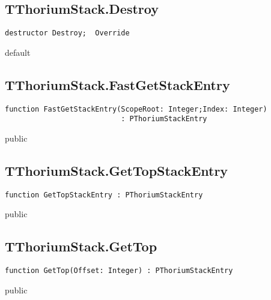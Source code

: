 \subsection{TThoriumStack.Destroy}
\label{thoriumcore:thorium:tthoriumstack:destroy}
\begin{FPCList}
\Synopsis
\Declaration 

\begin{verbatim}
destructor Destroy;  Override
\end{verbatim}
\Visibility
default
\Description
\Errors
\end{FPCList}
\subsection{TThoriumStack.FastGetStackEntry}
\label{thoriumcore:thorium:tthoriumstack:fastgetstackentry}
\begin{FPCList}
\Synopsis
\Declaration 

\begin{verbatim}
function FastGetStackEntry(ScopeRoot: Integer;Index: Integer)
                           : PThoriumStackEntry
\end{verbatim}
\Visibility
public
\Description
\Errors
\end{FPCList}
\subsection{TThoriumStack.GetTopStackEntry}
\label{thoriumcore:thorium:tthoriumstack:gettopstackentry}
\begin{FPCList}
\Synopsis
\Declaration 

\begin{verbatim}
function GetTopStackEntry : PThoriumStackEntry
\end{verbatim}
\Visibility
public
\Description
\Errors
\end{FPCList}
\subsection{TThoriumStack.GetTop}
\label{thoriumcore:thorium:tthoriumstack:gettop}
\begin{FPCList}
\Synopsis
\Declaration 

\begin{verbatim}
function GetTop(Offset: Integer) : PThoriumStackEntry
\end{verbatim}
\Visibility
public
\Description
\Errors
\end{FPCList}
